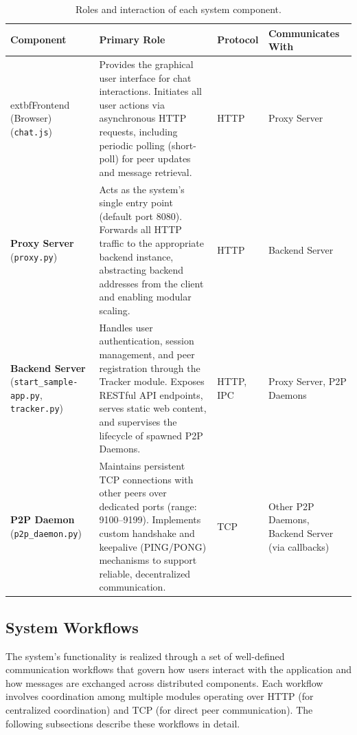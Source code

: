 \begin{table}[H]
\centering
\renewcommand{\arraystretch}{1.3}
\begin{tabular}{|p{3.2cm}|p{6cm}|p{1.7cm}|p{3cm}|}
\hline
\textbf{Component} & \textbf{Primary Role} & \textbf{Protocol} & \textbf{Communicates With} \\
\hline
	extbf{Frontend (Browser)} \newline (\texttt{chat.js}) & Provides the graphical user interface for chat interactions. Initiates all user actions via asynchronous HTTP requests, including periodic polling (short-poll) for peer updates and message retrieval. & HTTP & Proxy Server \\
\hline
\textbf{Proxy Server} \newline (\texttt{proxy.py}) & Acts as the system’s single entry point (default port 8080). Forwards all HTTP traffic to the appropriate backend instance, abstracting backend addresses from the client and enabling modular scaling. & HTTP & Backend Server \\
\hline
\textbf{Backend Server} \newline (\texttt{start\_sample-\break app.py}, \texttt{tracker.py}) & Handles user authentication, session management, and peer registration through the Tracker module. Exposes RESTful API endpoints, serves static web content, and supervises the lifecycle of spawned P2P Daemons. & HTTP, IPC & Proxy Server, P2P Daemons \\
\hline
\textbf{P2P Daemon} \newline (\texttt{p2p\_daemon.py}) & Maintains persistent TCP connections with other peers over dedicated ports (range: 9100–9199). Implements custom handshake and keepalive (PING/PONG) mechanisms to support reliable, decentralized communication. & TCP & Other P2P Daemons, Backend Server (via callbacks) \\
\hline
\end{tabular}
\caption{Roles and interaction of each system component.}
\label{tab:role-of-each-component}
\end{table}

\subsection{System Workflows}

The system’s functionality is realized through a set of well-defined communication workflows that govern how users interact with the application and how messages are exchanged across distributed components.
Each workflow involves coordination among multiple modules operating over HTTP (for centralized coordination) and TCP (for direct peer communication).
The following subsections describe these workflows in detail.

